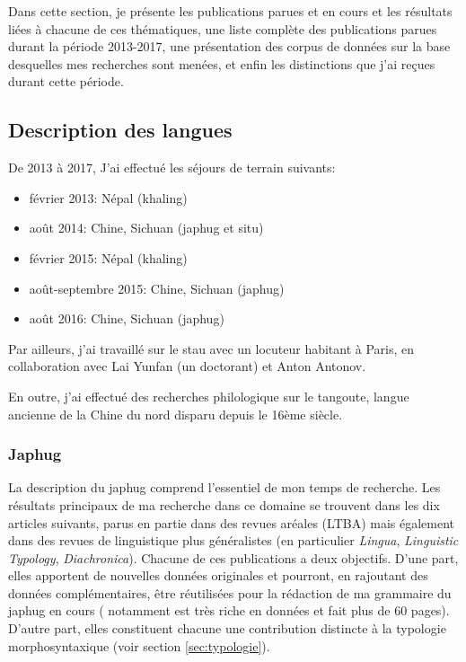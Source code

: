 \documentclass[oldfontcommands,oneside,a4paper,11pt]{article}
\begin{document}
Dans cette section, je présente les publications parues et en cours et les résultats liées à chacune de ces thématiques, une liste complète des publications parues durant la période 2013-2017, une présentation des corpus de données sur la base desquelles mes recherches sont menées, et enfin les distinctions que j'ai reçues durant cette période.

\subsection{Description des langues}
De 2013 à 2017, J'ai effectué les séjours de terrain suivants:

\begin{itemize}
\item février 2013: Népal (khaling)
\item août 2014: Chine, Sichuan (japhug et situ)
\item février 2015: Népal (khaling)
\item août-septembre 2015: Chine, Sichuan (japhug)
\item août 2016: Chine, Sichuan (japhug)
\end{itemize}

Par ailleurs, j'ai travaillé sur le stau avec un locuteur habitant à Paris, en collaboration avec Lai Yunfan (un doctorant) et Anton Antonov.


En outre, j'ai effectué des recherches philologique sur le tangoute, langue ancienne de la Chine du nord disparu depuis le 16ème siècle.

\subsubsection{Japhug} \label{sec:japhug}
La description du japhug comprend l'essentiel de mon temps de recherche. Les résultats principaux de ma recherche dans ce domaine se trouvent dans les dix articles suivants, parus en partie dans des revues aréales (LTBA) mais également dans des revues de linguistique plus généralistes (en particulier \textit{Lingua}, \textit{Linguistic Typology}, \textit{Diachronica}). Chacune de ces publications a deux objectifs. D'une part, elles apportent de nouvelles données originales et pourront, en rajoutant des données complémentaires, être réutilisées pour la rédaction de ma grammaire du japhug en cours (\citet{jacques14linking} notamment est très riche en données et fait plus de 60 pages). D'autre part, elles constituent chacune une contribution distincte à la typologie morphosyntaxique (voir section \ref{sec:typologie}).
\end{document}
